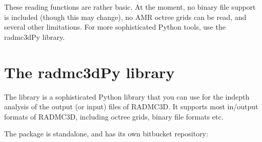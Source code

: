 \documentclass[letterpaper,10pt,english]{sphinxmanual}
\begin{document}
\begin{sphinxVerbatim}[commandchars=\\\{\}]
   
   
   
  
\PYG{p}{[}\PYG{p}{]}
  
\PYG{p}{[}\PYG{p}{]}
\end{sphinxVerbatim}

 These reading functions are rather basic. At the moment, no binary
file support is included (though this may change), no AMR octree grids can be
read, and several other limitations. For more sophisticated Python tools,
use the radmc3dPy library.


\section{The radmc3dPy library}
\label{\detokenize{pythontools:the-radmc3dpy-library}}
The  library is a sophisticated Python library that you
can use for the in\sphinxhyphen{}depth analysis of the output (or input) files of RADMC\sphinxhyphen{}3D.
It supports most in/output formats of RADMC\sphinxhyphen{}3D, including octree grids,
binary file formats etc.

The package is stand\sphinxhyphen{}alone, and has its own bitbucket repository:
\end{document}
